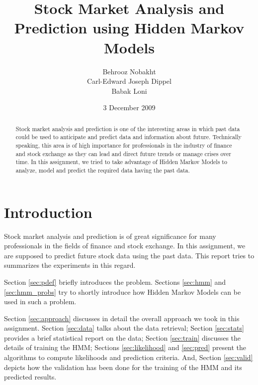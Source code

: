 \documentclass{acm_proc_article-sp}
\begin{document}
\title{Stock Market Analysis and Prediction using Hidden Markov Models}

\author{
  \alignauthor Behrooz Nobakht \\ 
  \alignauthor Carl-Edward Joseph Dippel\\ 
  \alignauthor Babak Loni\\ 
}

\date{3 December 2009}

\maketitle

\begin{abstract}
Stock market analysis and prediction is one of the interesting areas in which past data could be used to anticipate and
predict data and information about future. Technically speaking, this area is of high importance for professionals in
the industry of finance and stock exchange as they can lead and direct future trends or manage crises over time. In
this assignment, we tried to take advantage of Hidden Markov Models to analyze, model and predict the required data
having the past data.
\end{abstract}


\section{Introduction}
Stock market analysis and prediction is of great significance for many professionals in the fields of finance and stock
exchange. In this assignment, we are supposed to predict future stock data using the past data. This report tries to
summarizes the experiments in this regard.

Section \ref{sec:pdef} briefly introduces the problem. Sections \ref{sec:hmm} and \ref{sec:hmm_probs} try to shortly
introduce how Hidden Markov Models can be used in such a problem.

Section \ref{sec:approach} discusses in detail the overall approach we took in this assignment. Section \ref{sec:data}
talks about the data retrieval; Section \ref{sec:stats} provides a brief statistical report on the data; Section
\ref{sec:train} discusses the details of training the HMM; Sections \ref{sec:likelihood} and \ref{sec:pred} present
the algorithms to compute likelihoods and prediction criteria. And, Section \ref{sec:valid} depicts how the validation
has been done for the training of the HMM and its predicted results.
\end{document}
